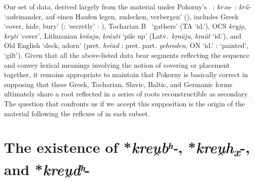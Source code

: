 \documentclass[output=paper,colorlinks,citecolor=brown]{langscibook}
\begin{document}
Our set of data, derived largely from the material under Pokorny’s \mbox{ :} \textit{krəu}- : \textit{krū̆-} ‘aufeinander, auf einen Haufen legen, zudecken, verbergen’ (), includes Greek  ‘cover, hide, bury’ (:  ‘secretly’ : ), Tocharian B ~‘gathers’ (TA  ‘id.’), OCS \textit{kryjǫ}, \textit{kryti} ‘cover’, Lithuanian \textit{kráuju}, \textit{kráuti} ‘pile up’ (Latv.\ \textit{k\c{r}aũju}, \textit{k\c{r}aũt} ‘id.’), and Old English  ‘deck, adorn’ (pret. \textit{hréad} : pret. part. \textit{gehroden}, ON  ‘id.’ :  ‘painted’,  ‘gilt’). Given that all the above-listed data bear segments reflecting the sequence  and convey lexical meanings involving the notion of covering or placement together, it remains appropriate to maintain that Pokorny is basically correct in supposing that these Greek, Tocharian, Slavic, Baltic, and Germanic forms ultimately share a root reflected in a series of roots reconstructible as secondary.  The question that confronts us if we accept this supposition is the origin of the material following the reflexes of  in each subset.

\section{The existence of *\textit{kreu̯bʰ-}, *\textit{kreu̯h\textsubscript{x}}-, and *\textit{kreu̯dʰ}-}
\end{document}
